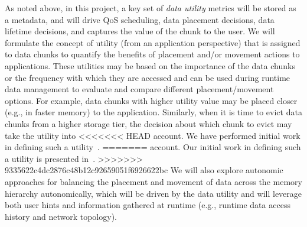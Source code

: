 As noted above, in this project, a key set of \textit{data utility} metrics 
will be stored as a metadata, and will drive QoS scheduling, data placement 
decisions, data lifetime decisions, and captures the value of the chunk to
the user. 
We will formulate the concept of utility (from an
application perspective) that is assigned to data chunks to quantify the
benefits of placement and/or movement actions to applications. These
utilities may be based on the importance of the data chunks or the frequency
with which they are accessed and can be used during runtime data
management to evaluate and compare different placement/movement options. 
For example, data chunks with higher utility value may be
placed closer (e.g., in faster memory) to the application.
Similarly, when it is time to evict data chunks from a higher storage
tier, the decision about which chunk to evict may take the utility into
<<<<<<< HEAD
account. We have performed initial work in defining such a utility~\cite{tongipdps15}.
=======
account. Our initial work in defining such a utility is presented in~\cite{tongipdps15,qiansc15}.
>>>>>>> 9335622c4dc2876c48b12c92659051f6926622bc
 We will also explore autonomic approaches for balancing the placement and 
 movement of data across the memory hierarchy autonomically, which will be driven 
 by the data utility and will leverage both user hints and information gathered at runtime (e.g., runtime data access
history and network topology).

%

